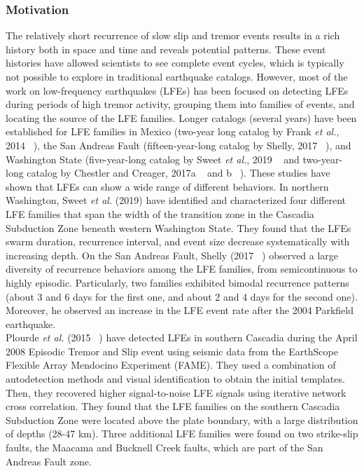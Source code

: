 \documentclass[letterpaper, 12pt]{article}
\begin{document}
\subsubsection*{Motivation}

The relatively short recurrence of slow slip and tremor events results in a rich history both in space and time and reveals potential patterns.  These event histories have allowed scientists to see complete event cycles, which is typically not possible to explore in traditional earthquake catalogs. However, most of the work on low-frequency earthquakes (LFEs) has been focused on detecting LFEs during periods of high tremor activity, grouping them into families of events, and locating the source of the LFE families. Longer catalogs (several years) have been established for LFE families in Mexico (two-year long catalog by Frank \textit{et al.}, 2014 ~\cite{FRA_2014}), the San Andreas Fault (fifteen-year-long catalog by Shelly, 2017 ~\cite{SHE_2017}), and Washington State (five-year-long catalog by Sweet \textit{et al.}, 2019 ~\cite{SWE_2019} and two-year-long catalog by Chestler and Creager, 2017a ~\cite{CHE_2017_JGR} and b ~\cite{CHE_2017_G3}). These studies have shown that LFEs can show a wide range of different behaviors. In northern Washington, Sweet \textit{et al.} (2019) have identified and characterized four different LFE families that span the width of the transition zone in the Cascadia Subduction Zone beneath western Washington State. They found that the LFEs swarm duration, recurrence interval, and event size decrease systematically with increasing depth. On the San Andreas Fault, Shelly (2017 ~\cite{SHE_2017}) observed a large diversity of recurrence behaviors among the LFE families, from semicontinuous to highly episodic. Particularly, two families exhibited bimodal recurrence patterns (about 3 and 6 days for the first one, and about 2 and 4 days for the second one). Moreover, he observed an increase in the LFE event rate after the 2004 Parkfield earthquake. \\

Plourde \textit{et al.} (2015 ~\cite{PLO_2015}) have detected LFEs in southern Cascadia during the April 2008 Episodic Tremor and Slip event using seismic data from the EarthScope Flexible Array Mendocino Experiment (FAME). They used a combination of autodetection methods and visual identification to obtain the initial templates. Then, they recovered higher signal-to-noise LFE signals using iterative network cross correlation. They found that the LFE families on the southern Cascadia Subduction Zone were located above the plate boundary, with a large distribution of depths (28-47 km). Three additional LFE families were found on two strike-slip faults, the Maacama and Bucknell Creek faults, which are part of the San Andreas Fault zone. \\
\end{document}
